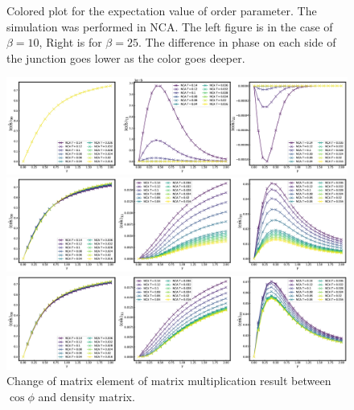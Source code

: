 \documentclass{article}[12pt]
\begin{document}
\begin{spacing}{1.5}
\begin{figure}[htbp]
  \caption{Colored plot for the expectation value of order parameter. The simulation was performed in NCA. The left figure is in the case of $\beta=10$, Right is for $\beta=25$.
  The difference in phase on each side of the junction goes lower as the color goes deeper.}
\end{figure}
\begin{figure}[H]
  \centerline{\includegraphics[width=17cm]{TexFigure/Matele_Ns3_alp0.png}}
  \centerline{\includegraphics[width=17cm]{TexFigure/Matele_Ns3_alp0_1.png}}
  \centerline{\includegraphics[width=17cm]{TexFigure/Matele_Ns3_alp1.png}}
  \caption{Change of matrix element of matrix multiplication result between $\cos\phi$ and density matrix.}
\end{figure}

\end{spacing}
\end{document}

